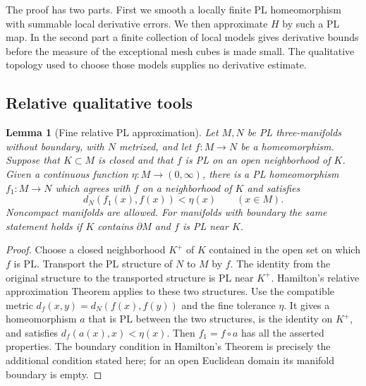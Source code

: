 \documentclass[11pt]{article}
\numberwithin{equation}{section}
\newtheorem{lemma}[theorem]{Lemma}
\theoremstyle{definition}
\theoremstyle{remark}
\begin{document}
The proof has two parts.  First we smooth a locally finite PL
homeomorphism with summable local derivative errors.  We then approximate
$H$ by such a PL map.  In the second part a finite collection of local
models gives derivative bounds before the measure of the exceptional
mesh cubes is made small.  The qualitative topology used to choose those
models supplies no derivative estimate.

\subsection{Relative qualitative tools}

\begin{lemma}[Fine relative PL approximation]
\label{sm:relative-pl}
Let $M,N$ be PL three-manifolds without boundary, with $N$ metrized,
and let $f:M\to N$ be a homeomorphism.  Suppose that $K\subset M$ is
closed and that $f$ is PL on an open neighborhood of $K$.  Given a
continuous function $\eta:M\to(0,\infty)$, there is a PL
homeomorphism $f_1:M\to N$ which agrees with $f$ on a neighborhood of
$K$ and satisfies
\[
 d_N(f_1(x),f(x))<\eta(x)\qquad(x\in M).
\]
Noncompact manifolds are allowed.  For manifolds with boundary the same
statement holds if $K$ contains $\partial M$ and $f$ is PL near $K$.
\end{lemma}

\begin{proof}
Choose a closed neighborhood $K^+$ of $K$ contained in the open set on
which $f$ is PL.  Transport the PL structure of $N$ to $M$ by $f$.
The identity from the original structure to the transported structure
is PL near $K^+$.  Hamilton's relative approximation Theorem
\cite[Section~3, Theorem~2.2, pp.~68--69]{Hamilton1976} applies to these
two structures.  Use the compatible metric
$d_f(x,y)=d_N(f(x),f(y))$ and the fine tolerance $\eta$.
It gives a homeomorphism $a$ that is PL between the two structures,
is the identity on $K^+$, and satisfies
$d_f(a(x),x)<\eta(x)$.  Then $f_1=f\circ a$ has all the asserted
properties.  The boundary condition in Hamilton's Theorem is precisely
the additional condition stated here; for an open Euclidean domain its
manifold boundary is empty.
\end{proof}
\end{document}
